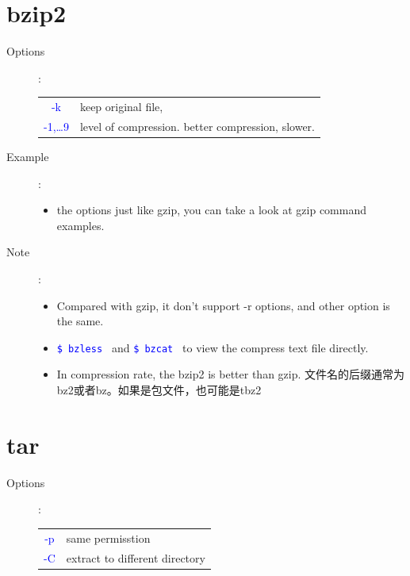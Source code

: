 \documentclass[a4paper,12pt,twoside]{book}
\newcommand{\linuxcommand}[1]{\texttt{\textcolor{blue}{\$ #1 \Pisymbol{psy}{191}}}}
\newcommand{\op}[1]{\textcolor{blue}{-#1}}
\begin{document}
\begin{CJK*}{UTF8}{song}
\section{bzip2}
	\begin{description}
	\item[Options]: \\
		\begin{tabular}{c|p{}}
		\hline
		\op{k} & keep original file, \\
		\op{1,\ldots 9} & level of compression. better compression, slower.\\
		\hline
		\end{tabular}
	\item[Example]:
		\begin{itemize}
		\item the options just like gzip, you can take a look at gzip command examples.
		\end{itemize}
	\item[Note]:
		\begin{itemize}
		\item  Compared with gzip, it don't support -r options, and other option is the same.
		\item \linuxcommand{bzless} and \linuxcommand{bzcat} to view the compress text file directly.
		\item In compression rate, the bzip2 is better than gzip. 文件名的后缀通常为bz2或者bz。如果是包文件，也可能是tbz2
		\end{itemize}
	\end{description}
\section{tar}
	\begin{description}
	\item[Options]:\\
		\begin{tabular}{c|p{}}
		\hline
		\op{p} & same permisstion \\
		\op{C} & extract to different directory \\
		\hline
		\end{tabular} \vspace{1ex} \\
		

\end{description}
\end{CJK*}
\end{document}

